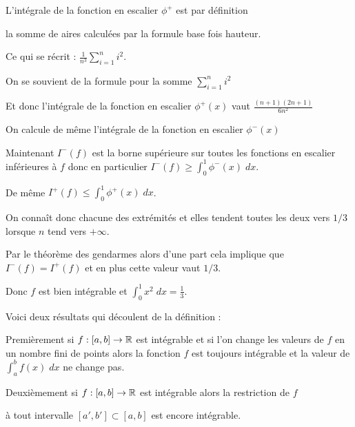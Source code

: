 \change

L'intégrale de la fonction en escalier $\phi^+$ est par définition

 la somme de aires calculées par la formule 
base fois hauteur.

Ce qui se récrit :
$ \frac{1}{n^3} \sum_{i=1}^n i^2.$

\change

On se souvient de la formule pour la somme $\sum_{i=1}^n i^2$

\change

Et donc l'intégrale de la fonction en escalier $\phi^+(x)$ vaut 
$\frac{(n + 1)(2n + 1)}{6n^2}$


\change

On calcule de même l'intégrale de la fonction en escalier $\phi^-(x)$

\change

Maintenant $I^-(f)$ est la borne supérieure sur toutes les fonctions en escalier inférieures à $f$
donc en particulier $I^-(f) \ge \int_0^1 \phi^-(x)\; dx$.

\change

De même $I^+(f) \le \int_0^1 \phi^+(x)\; dx$.

\change

On connaît donc chacune des extrémités et elles tendent 
toutes les deux vers $1/3$ lorsque $n$ tend vers $+\infty$.

Par le théorème des gendarmes alors d'une part cela implique que $I^-(f)= I^+(f)$
et en plus cette valeur vaut $1/3$.

\change

Donc $f$ est bien intégrable et $\int_0^1 x^2\; dx = \frac13$.




\diapo

Voici deux résultats qui découlent de la définition :

Premièrement si $f : [a,b] \to \mathbb{R}$ est intégrable et si l'on change les valeurs de $f$
en un nombre fini de points alors la fonction $f$ est 
toujours intégrable et la valeur de $\int_a^b f(x)\; dx$ ne change pas.

\change

Deuxièmement si $f  : [a,b] \to \mathbb{R}$ est intégrable alors la restriction de $f$

à tout intervalle $[a',b'] \subset [a,b]$ est encore intégrable.


\diapo

